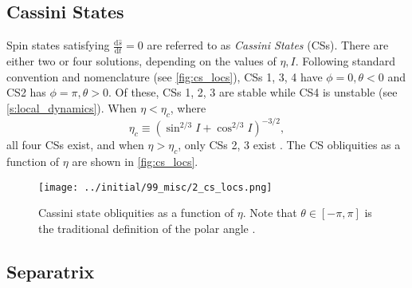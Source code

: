 \documentclass[
        fleqn,
        usenatbib,
        referee,
    ]{mnras}
\newcommand*{\rd}[2]{\frac{\mathrm{d}#1}{\mathrm{d}#2}}
\newcommand*{\p}[1]{\left(#1\right)}
\begin{document}
\subsection{Cassini States}\label{ss:cs}

Spin states satisfying $\rd{\hat{s}}{t} = 0$ are referred to as \emph{Cassini
States} (CSs). There are either two or four solutions, depending on the values
of $\eta, I$. Following standard convention and nomenclature (see
\autoref{fig:cs_locs}), CSs 1, 3, 4 have $\phi = 0, \theta < 0$ and CS2 has
$\phi = \pi, \theta > 0$. Of these, CSs 1, 2, 3 are stable while CS4 is unstable
(see \autoref{s:local_dynamics}). When $\eta < \eta_c$, where
\begin{equation}
    \eta_c \equiv \p{\sin^{2/3}I + \cos^{2/3}I}^{-3/2},
\end{equation}
all four CSs exist, and when $\eta > \eta_c$, only CSs 2, 3 exist
\citep{henrard1987,ward2004I}. The CS obliquities as a function of $\eta$ are
shown in \autoref{fig:cs_locs}.
\begin{figure}
    \centering
    \texttt{[image: ../initial/99\_misc/2\_cs\_locs.png]}
    \caption{Cassini state obliquities as a function of $\eta$. Note that
    $\theta \in [-\pi, \pi]$ is the traditional definition of the polar angle
    \citep[see e.g.][]{colombo1966,peale1969,henrard1987}.}\label{fig:cs_locs}
\end{figure}

\subsection{Separatrix}
\end{document}
